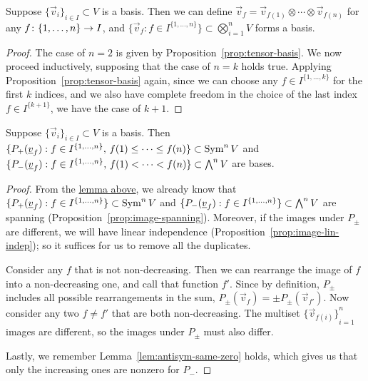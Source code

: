 \begin{lemma}\label{lem:tensor-n-basis}
    Suppose \({\{\vec{v}_i\}}_{i \in I} \subset V\) is a basis.
    Then we can define \(\vec{v}_f = \vec{v}_{f(1)} \otimes \cdots \otimes \vec{v}_{f(n)}\)
    for any \(f\colon\{1,\hdots,n\}\to I\),
    and \({\{\vec{v}_f: f \in I^{\{1,\hdots,n\}}\}} \subset \bigotimes_{i=1}^n V\)
    forms a basis.
\end{lemma}
\begin{proof}
    The case of \(n = 2\) is given by Proposition~\ref{prop:tensor-basis}.
    We now proceed inductively,
    supposing that the case of \(n = k\) holds true.
    Applying Proposition~\ref{prop:tensor-basis} again,
    since we can choose any \(f \in I^{\{1,\hdots,k\}}\) for the first \(k\) indices,
    and we also have complete freedom in the choice of the last index \(f \in I^{\{k+1\}}\),
    we have the case of \(k+1\).
\end{proof}
\begin{theorem}\label{thm:sym-antisym-basis}
    Suppose \({\{\vec{v}_i\}}_{i \in I} \subset V\) is a basis.
    Then \(\{P_+(\underline{v}_f): f \in I^{\{1,\hdots,n\}},\,f(1) \leq \cdots \leq f(n)\} \subset \operatorname{Sym}^n V\)
    and \(\{P_-(\underline{v}_f): f \in I^{\{1,\hdots,n\}},\,f(1) < \cdots < f(n)\} \subset \operatorname{{\bigwedge}}^n V\)
    are bases.
\end{theorem}
\begin{proof}
    From the \hyperref[lem:tensor-n-basis]{lemma above},
    we already know that \(\{P_+(\underline{v}_f): f \in I^{\{1,\hdots,n\}}\} \subset \operatorname{Sym}^n V\)
    and \(\{P_-(\underline{v}_f): f \in I^{\{1,\hdots,n\}}\} \subset \operatorname{{\bigwedge}}^n V\) are spanning
    (Proposition~\ref{prop:image-spanning}).
    Moreover, if the images under \(P_\pm\) are different,
    we will have linear independence (Proposition~\ref{prop:image-lin-indep});
    so it suffices for us to remove all the duplicates.
    
    Consider any \(f\) that is not non-decreasing.
    Then we can rearrange the image of \(f\) into a non-decreasing one,
    and call that function \(f'\).
    Since by definition, \(P_\pm\) includes all possible rearrangements in the sum,
    \(P_\pm(\vec{v}_f) = \pm P_\pm(\vec{v}_{f'})\).
    Now consider any two \(f \neq f'\) that are both non-decreasing.
    The multiset \({\{\vec{v}_{f(i)}\}}_{i=1}^n\) images are different,
    so the images under \(P_\pm\) must also differ.

    Lastly, we remember Lemma~\ref{lem:antisym-same-zero} holds,
    which gives us that only the increasing ones are nonzero for \(P_-\).
\end{proof}
